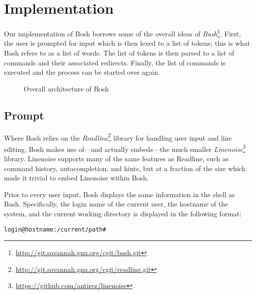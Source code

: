 \section{Implementation}
\label{sec:implementation}

Our implementation of Bosh borrows some of the overall ideas of \textit{Bash}\footnote{\url{http://git.savannah.gnu.org/cgit/bash.git}}. First, the user is prompted for input which is then lexed to a list of tokens; this is what Bash refers to as a list of words. The list of tokens is then parsed to a list of commands and their associated redirects. Finally, the list of commands is executed and the process can be started over again.

\begin{figure}[ht]
  \centering

  \caption{Overall architecture of Bosh}
  \label{fig:architecture}
\end{figure}

\subsection{Prompt}

Where Bash relies on the \textit{Readline}\footnote{\url{http://git.savannah.gnu.org/cgit/readline.git}} library for handling user input and line editing, Bosh makes use of---and actually embeds---the much smaller \textit{Linenoise}\footnote{\url{https://github.com/antirez/linenoise}} library. Linenoise supports many of the same features as Readline, such as command history, autocompletion, and hints, but at a fraction of the size which made it trivial to embed Linenoise within Bosh.

Prior to every user input, Bosh displays the same information in the shell as Bash. Specifically, the login name of the current user, the hostname of the system, and the current working directory is displayed in the following format:

\begin{lstlisting}
login@hostname:/current/path#
\end{lstlisting}

